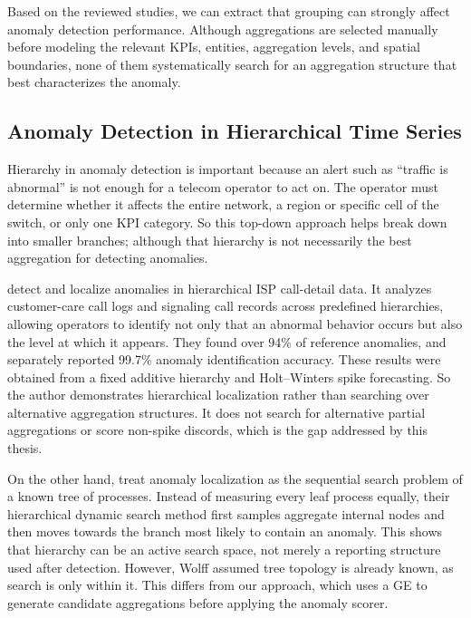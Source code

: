 Based on the reviewed studies, we can extract that grouping can strongly affect anomaly detection performance.
Although aggregations are selected manually before modeling the relevant \ac{KPI}s, entities, aggregation levels, and spatial boundaries, none of them systematically search for an aggregation structure that best characterizes the anomaly.

\subsection{Anomaly Detection in Hierarchical Time Series}

Hierarchy in anomaly detection is important because an alert such as ``traffic is abnormal'' is not enough for a telecom operator to act on.
The operator must determine whether it affects the entire network, a region or specific cell of the switch, or only one \ac{KPI} category.
So this top-down approach helps break down into smaller branches; although that hierarchy is not necessarily the best aggregation for detecting anomalies.

\textcite{hong2012tiresias} detect and localize anomalies in hierarchical \ac{ISP} call-detail data.
It analyzes customer-care call logs and signaling call records across predefined hierarchies, allowing operators to identify not only that an abnormal behavior occurs but also the level at which it appears.
They found over 94\% of reference anomalies, and separately reported 99.7\% anomaly identification accuracy.
These results were obtained from a fixed additive hierarchy and Holt--Winters spike forecasting.
So the author demonstrates hierarchical localization rather than searching over alternative aggregation structures.
It does not search for alternative partial aggregations or score non-spike discords, which is the gap addressed by this thesis.

On the other hand, \textcite{wolff2022composite} treat anomaly localization as the sequential search problem of a known tree of processes.
Instead of measuring every leaf process equally, their hierarchical dynamic search method first samples aggregate internal nodes and then moves towards the branch most likely to contain an anomaly.
This shows that hierarchy can be an active search space, not merely a reporting structure used after detection.
However, Wolff assumed tree topology is already known, as search is only within it.
This differs from our approach, which uses a \ac{GE} to generate candidate aggregations before applying the anomaly scorer.


